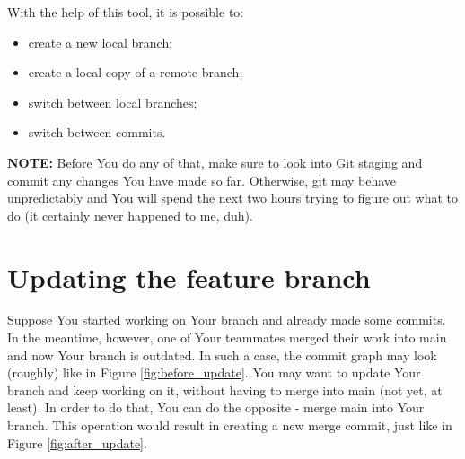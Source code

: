 \documentclass{article}
\begin{document}
With the help of this tool, it is possible to:

\begin{itemize}
    \item create a new local branch;
    \item create a local copy of a remote branch;
    \item switch between local branches;
    \item switch between commits.
\end{itemize}

\textbf{NOTE: } Before You do any of that, make sure to look into \hyperref[sec:git_staging]{Git staging} and commit any changes You have made so far. Otherwise, git may behave unpredictably and You will spend the next two hours trying to figure out what to do (it certainly never happened to me, duh). 

\section{Updating the feature branch}

Suppose You started working on Your branch and already made some commits. In the meantime, however, one of Your teammates merged their work into main and now Your branch is outdated. In such a case, the commit graph may look (roughly) like in Figure \ref{fig:before_update}. You may want to update Your branch and keep working on it, without having to merge into main (not yet, at least). In order to do that, You can do the opposite - merge main into Your branch. This operation would result in creating a new merge commit, just like in Figure \ref{fig:after_update}.\newline
\end{document}
